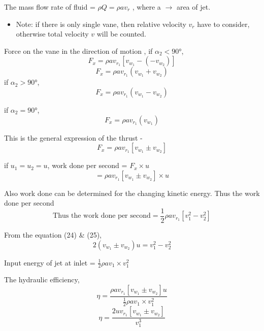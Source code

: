 \documentclass{article}
\begin{document}
The mass flow rate of fluid = $\rho Q = \rho a v_r$ , where a $\rightarrow$ area of jet. 

\begin{itemize}
  \item Note: if there is only single vane, then relative velocity $v_r$ have to consider, otherwise total velocity $v$ will be counted. 
\end{itemize}

Force on the vane in the direction of motion , if $\alpha_2  < 90$°,
$$F_x = \rho a v_{r_1} \left[v_{w_1} - \left(-v_{w_2}\right)\right]$$
\begin{equation}
  F_x = \rho a v_{r_1} \left(v_{w_1} + v_{w_2}\right) \label{eq:eq21}
\end{equation}
if $\alpha_2  > 90$°, 
\begin{equation}
  F_x = \rho a v_{r_1} \left(v_{w_1} - v_{w_2}\right) \label{eq:eq22}
\end{equation}

if $\alpha_2  = 90$°, 
\begin{equation}
  F_x = \rho a v_{r_1} \left(v_{w_1} \right) \label{eq:eq23}
\end{equation}

This is the general expression of the thrust - 
$$F_x = \rho a v_{r_1} \left[v_{w_1} \pm  v_{w_2}\right]$$

if $u_1=u_2=u$, work done per second = $F_x \times u$
\begin{equation}
  = \rho a v_{r_1} \left[v_{w_1} \pm  v_{w_2}\right] \times u  \label{eq:eq24}
\end{equation}

Also work done can be determined for the changing kinetic energy. Thus the work done per second
\begin{equation}
  \text{Thus the work done per second} = \frac{1}{2} \rho a v_{r_1} \left[v_1^2 - v_2^2\right]  \label{eq:eq25}
\end{equation}

From the equation (24) \& (25),
\begin{equation}
  2(v_{w_1} \pm v_{w_2}) u = v_1^2 - v_2^2 \label{eq:eq26}
\end{equation}

Input energy of jet at inlet = $\frac{1}{2} \rho a v_1 \times v_1^2 $

The hydraulic efficiency, $$\eta = \frac{\rho a v_{r_1}  \left[v_{w_1} \pm  v_{w_2}\right] u}{\frac{1}{2} \rho a v_1 \times v_1^2}$$
\begin{equation}
  \eta = \frac{2 u v_{r_1}  \left[v_{w_1} \pm  v_{w_2}\right]}{v_1^3}  \label{eq:eq27}
\end{equation}
\pagebreak
\end{document}
